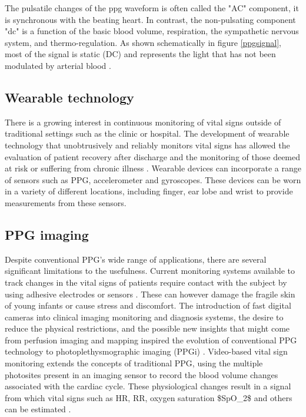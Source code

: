 The pulsatile changes of the \gls{ppg} waveform is often called the "AC" component, it is synchronous with the beating heart. In contrast, the non-pulsating component "\gls{dc}" is a function of the basic blood volume,  respiration,  the  sympathetic nervous system, and thermo-regulation. As shown  schematically  in figure \ref{ppgsignal},  most of the signal is static (DC) and represents the light that has not been modulated by arterial blood \cite{mendelson1992pulse}. 

\subsection{Wearable technology}

There is a growing interest in continuous monitoring of vital signs outside of traditional settings such as the clinic or hospital. The development of wearable technology that unobtrusively and reliably monitors vital signs has allowed the evaluation of patient recovery after discharge and the monitoring of those deemed at risk or suffering from chronic illness \cite{bonato2005advances}. Wearable devices can incorporate a range of sensors such as PPG, accelerometer and gyroscopes. These devices can be worn in a variety of different locations, including finger, ear lobe and wrist to provide measurements from these sensors.

\subsection{PPG imaging}

Despite conventional PPG’s wide range of applications, there are several significant limitations to the usefulness. Current monitoring systems available to track changes in the vital signs of patients require contact with the subject by using adhesive electrodes or sensors \cite{villarroel2017non}. These can however damage the fragile skin of young infants or cause stress and discomfort. The introduction of fast digital cameras into clinical imaging monitoring and diagnosis systems, the desire to reduce the physical restrictions, and the possible new insights that might come from perfusion imaging and mapping inspired the evolution of conventional PPG technology to photoplethysmographic imaging (PPGi) \cite{sun2015photoplethysmography}. Video-based vital sign monitoring extends the concepts of traditional PPG, using the multiple photosites present in an imaging sensor to record the blood volume changes associated with the cardiac cycle. These physiological changes result in a signal from which vital signs such as HR, RR, oxygen saturation \gls{$SpO_2$} and others can be estimated \cite{tarassenko2014non, villarroel2014continuous}.

